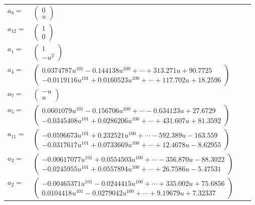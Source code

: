\documentclass[1p]{elsarticle_modified}
\theoremstyle{definition}
\begin{document}
\begin{tabular}{m{7pt} m{180pt} m{7pt} m{180pt} }
\flushright $a_{8}=$&$\begin{pmatrix}0\\u\end{pmatrix}$ \\
\flushright $a_{12}=$&$\begin{pmatrix}1\\0\end{pmatrix}$ \\
\flushright $a_{1}=$&$\begin{pmatrix}1\\- u^2\end{pmatrix}$ \\
\flushright $a_{4}=$&$\begin{pmatrix}0.0374787 u^{101}-0.144138 u^{100}+\cdots+313.271 u+90.7725\\-0.0119116 u^{101}+0.0160523 u^{100}+\cdots+117.702 u+18.2596\end{pmatrix}$ \\
\flushright $a_{7}=$&$\begin{pmatrix}- u\\u\end{pmatrix}$ \\
\flushright $a_{5}=$&$\begin{pmatrix}0.0601079 u^{101}-0.156706 u^{100}+\cdots-0.634123 u+27.6729\\-0.0345408 u^{101}+0.0286206 u^{100}+\cdots+431.607 u+81.3592\end{pmatrix}$ \\
\flushright $a_{11}=$&$\begin{pmatrix}-0.0596673 u^{101}+0.232521 u^{100}+\cdots-592.389 u-163.559\\-0.0317617 u^{101}+0.0733669 u^{100}+\cdots+12.4678 u-8.62955\end{pmatrix}$ \\
\flushright $a_{3}=$&$\begin{pmatrix}-0.00617077 u^{101}+0.0554503 u^{100}+\cdots-356.870 u-88.3022\\-0.0245955 u^{101}+0.0557894 u^{100}+\cdots+26.7586 u-5.47531\end{pmatrix}$ \\
\flushright $a_{2}=$&$\begin{pmatrix}-0.00465371 u^{101}-0.0244415 u^{100}+\cdots+335.002 u+75.6856\\0.0104418 u^{101}-0.0279042 u^{100}+\cdots+9.19679 u+7.32337\end{pmatrix}$ \\

\end{tabular}
\end{document}
